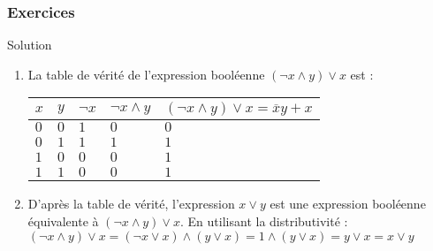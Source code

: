 \documentclass[9pt]{beamer}
\newcounter{num}
\begin{document}
\begin{frame}
\frametitle{Exercices}

\begin{exampleblock}{Solution}
\begin{enumerate}
\item La table de vérité de l'expression booléenne  $ (\neg x \wedge y) \vee x$ est :
\begin{center}
\begin{tabular}{*{3}{|C{0.6cm}}|C{1.2cm}|C{2.8cm}|}\hline
$x$ & $y$ & $\neg x$&$\neg x \wedge y$ & $(\neg x \wedge y) \vee x=\overline{x}y+x$\\\hline
$0$ & $0$ & $1$ & $0$ & $0$ \\\hline
$0$ & $1$ & $1$ & $1$ & $1$\\\hline
$1$ & $0$ & $0$ & $0$ & $1$\\\hline
$1$ & $1$ & $0$ & $0$ & $1$\\\hline
\end{tabular}
\end{center}
\medskip
\item D'après la table de vérité, l'expression $x \vee y$ est une expression booléenne équivalente à $ (\neg x \wedge y) \vee x$. 
En utilisant la distributivité : \\
$ (\neg x \wedge y) \vee x = (\neg x \vee x) \wedge (y \vee x) = 1 \wedge (y \vee x) = y \vee x = x \vee y$
\end{enumerate}
\end{exampleblock}
\end{frame}
\end{document}
